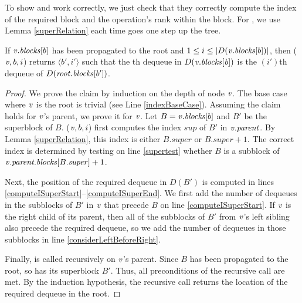 To show   and  work correctly, we  just  check that they correctly compute the index of the required block
and the operation's rank within the block.  
For , we use Lemma \ref{superRelation} each time  goes one step up the tree.

\begin{lemma}\label{lem::indexDequeue}
If $\mbox{\textnormal{\textit{v}}}.\mbox{\textit{blocks}}[b]$ has been propagated to the root and $1\leq i\leq |D(\mbox{\textnormal{\textit{v}}}.\mbox{\textit{blocks}}[b])|$, 
 then ($\mbox{\textnormal{\textit{v}}}, b, i$) returns $\langle b',i' \rangle$ such that the th dequeue in $D(\mbox{\textnormal{\textit{v}}}.\mbox{\textit{blocks}}[\mbox{\textnormal{\textit{b}}}])$ is the $(i')$th dequeue of $D(\mbox{\textnormal{\textit{root}}}.\mbox{\textit{blocks}}[b'])$.
\end{lemma}

\begin{proof}
We prove the claim by induction on the depth of node $\mbox{\textnormal{\textit{v}}}$. The base case where $\mbox{\textnormal{\textit{v}}}$ is the root is trivial (see Line \ref{indexBaseCase}).
Assuming the claim holds for $\mbox{\textnormal{\textit{v}}}$'s parent, we prove it for $\mbox{\textnormal{\textit{v}}}$.
Let $B=\mbox{\textnormal{\textit{v}}}.\mbox{\textit{blocks}}[b]$ and $B'$ be the superblock of $B$.
($\mbox{\textnormal{\textit{v}}}, b, i$) first computes the index $sup$ of $B'$ in $\mbox{\textnormal{\textit{v}}}.\mbox{\textit{parent}}$.
By Lemma \ref{superRelation}, this index is either $B.super$ or $B.super+1$.
The correct index is determined by testing on line \ref{supertest} whether $B$ is a subblock of $\mbox{\textnormal{\textit{v}}}.\mbox{\textit{parent.blocks}}[B.\mbox{\textit{super}}]+1$.

Next, the position of the required dequeue in $D(B')$ is computed in 
lines \ref{computeISuperStart}--\ref{computeISuperEnd}. 
We first add the number of dequeues in the subblocks of $B'$ in $\mbox{\textnormal{\textit{v}}}$ that precede $B$ on line \ref{computeISuperStart}.
If $\mbox{\textnormal{\textit{v}}}$ is the right child of its parent, then all of the subblocks of $B'$ from $\mbox{\textnormal{\textit{v}}}$'s left sibling
also precede the required dequeue, so we add the number of dequeues in those subblocks in line \ref{considerLeftBeforeRight}.

Finally,  is called recursively on $\mbox{\textnormal{\textit{v}}}$'s parent.
Since $B$ has been propagated to the root, so has its superblock $B'$.
Thus, all preconditions of the recursive call are met.
By the induction hypothesis, the recursive call returns the location of the required dequeue in the root.\end{proof}


